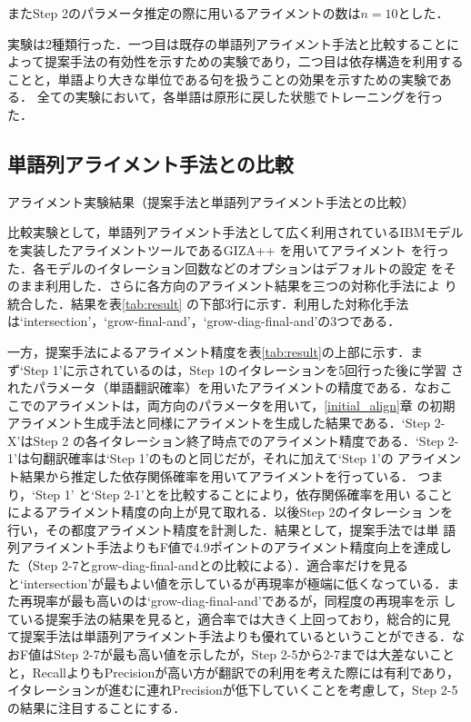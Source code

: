 \documentclass[japanese]{jnlp_1.4}
\begin{document}
またStep 2のパラメータ推定の際に用いるアライメントの数は$n=10$とした．

実験は2種類行った．一つ目は既存の単語列アライメント手法と比較することに
よって提案手法の有効性を示すための実験であり，二つ目は依存構造を利用する
ことと，単語より大きな単位である句を扱うことの効果を示すための実験である．
全ての実験において，各単語は原形に戻した状態でトレーニングを行った．



\subsection{単語列アライメント手法との比較}
\label{exp1}

\begin{table}[b]
  \caption{アライメント実験結果（提案手法と単語列アライメント手法との比較）}
  \label{tab:result}

\end{table}

比較実験として，単語列アライメント手法として広く利用されているIBMモデル
を実装したアライメントツールであるGIZA++ \cite{Och03}を用いてアライメント
を行った．各モデルのイタレーション回数などのオプションはデフォルトの設定
をそのまま利用した．さらに各方向のアライメント結果を三つの対称化手法によ
り統合した\cite{koehn-och-marcu:2003:HLTNAACL}．結果を表\ref{tab:result} 
の下部3行に示す．利用した対称化手法は`intersection'，`grow-final-and'，`grow-diag-final-and'の3つである\cite{Koehn_IWSLT05}．


一方，提案手法によるアライメント精度を表\ref{tab:result}の上部に示す．ま
ず`Step 1'に示されているのは，Step 1のイタレーションを5回行った後に学習
されたパラメータ（単語翻訳確率）を用いたアライメントの精度である．なおこ
こでのアライメントは，両方向のパラメータを用いて，\ref{initial_align}章
の初期アライメント生成手法と同様にアライメントを生成した結果である．`Step 2-X'はStep 2 の各イタレーション終了時点でのアライメント精度である．`Step 2-1'は句翻訳確率は`Step 1'のものと同じだが，それに加えて`Step 1'の
アライメント結果から推定した依存関係確率を用いてアライメントを行っている．
つまり，`Step 1' と`Step 2-1'とを比較することにより，依存関係確率を用い
ることによるアライメント精度の向上が見て取れる．以後Step 2のイタレーショ
ンを行い，その都度アライメント精度を計測した．結果として，提案手法では単
語列アライメント手法よりもF値で4.9ポイントのアライメント精度向上を達成し
た（Step 2-7とgrow-diag-final-andとの比較による）．適合率だけを見ると`intersection'が最もよい値を示しているが再現率が極端に低くなっている．ま
た再現率が最も高いのは`grow-diag-final-and'であるが，同程度の再現率を示
している提案手法の結果を見ると，適合率では大きく上回っており，総合的に見
て提案手法は単語列アライメント手法よりも優れているということができる．な
おF値はStep 2-7が最も高い値を示したが，Step 2-5から2-7までは大差ないこと
と，RecallよりもPrecisionが高い方が翻訳での利用を考えた際には有利であり，
イタレーションが進むに連れPrecisionが低下していくことを考慮して，Step
2-5 の結果に注目することにする．
\end{document}
